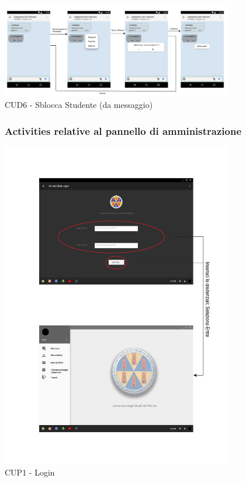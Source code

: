 \begin{figure}
	\centering
	\includegraphics[width=0.9\textwidth]{imgs/gruppo6/activities/act_cud6_sblocca_da_messaggio.pdf}
	\caption{CUD6 - Sblocca Studente (da messaggio)}
	\label{fig:act-cud6-2}
\end{figure}

\pagebreak
\begin{figure}[!h]
	\subsubsection{Activities relative al pannello di amministrazione}
	\centering
	\includegraphics[width=0.9\textwidth]{imgs/gruppo6/activities/act_cup1_login.pdf}
	\caption{CUP1 - Login}
	\label{fig:act-cup1}
\end{figure}

